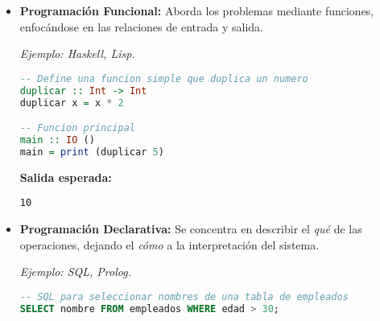 \documentclass{report}
\begin{document}
\begin{itemize}
\begin{minipage}{\linewidth}
\begin{lstlisting}[language=C, caption=Ejemplo de Programacion Imperativa en C]
int main() {
    int contador = 0; // Inicializa una variable

    // Ciclo para incrementar la variable
    for (int i = 0; i < 5; i++) {
        contador += i;
        printf("Valor actual del contador: %d\n", contador);
    }

    return 0;
}
\end{lstlisting}

\textbf{Salida esperada:}
\begin{verbatim}
Valor actual del contador: 0
Valor actual del contador: 1
Valor actual del contador: 3
Valor actual del contador: 6
Valor actual del contador: 10
\end{verbatim}
\end{minipage} %

\item \textbf{Programación Funcional:} Aborda los problemas mediante funciones, enfocándose en las relaciones de entrada y salida. 

\textit{Ejemplo: Haskell, Lisp.}

\begin{minipage}{\linewidth} %
\begin{lstlisting}[language=Haskell, caption=Ejemplo de Programacion Funcional en Haskell]
-- Define una funcion simple que duplica un numero
duplicar :: Int -> Int
duplicar x = x * 2

-- Funcion principal
main :: IO ()
main = print (duplicar 5)
\end{lstlisting}

\textbf{Salida esperada:}
\begin{verbatim}
10
\end{verbatim}
\end{minipage} %

\item \textbf{Programación Declarativa:} Se concentra en describir el \textit{qué} de las operaciones, dejando el \textit{cómo} a la interpretación del sistema. 

\textit{Ejemplo: SQL, Prolog.}

\begin{minipage}{\linewidth} %
\begin{lstlisting}[language=SQL, caption=Ejemplo de Programacion Declarativa en SQL]
-- SQL para seleccionar nombres de una tabla de empleados
SELECT nombre FROM empleados WHERE edad > 30;
\end{lstlisting}


\end{minipage}
\end{itemize}
\end{document}
